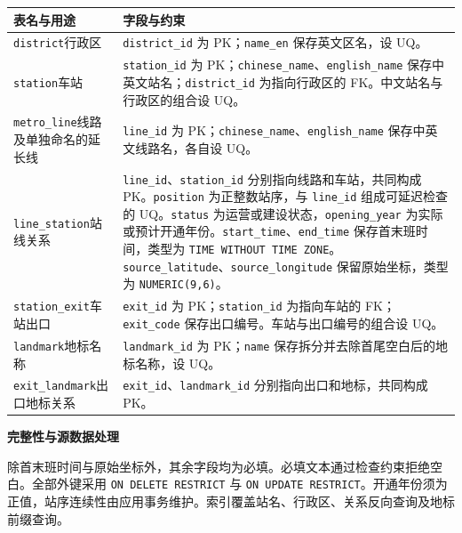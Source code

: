\documentclass[10pt,a4paper]{article}
\begin{document}
\begin{tabularx}{\linewidth}{@{}p{33mm}L@{}}
\toprule
\textbf{表名与用途} & \textbf{字段与约束}\\
\midrule
\texttt{district}\newline 行政区 &
\texttt{district\_id} 为 PK；\texttt{name\_en} 保存英文区名，设 UQ。\\
\addlinespace
\texttt{station}\newline 车站 &
\texttt{station\_id} 为 PK；\texttt{chinese\_name}、\texttt{english\_name} 保存中英文站名；\texttt{district\_id} 为指向行政区的 FK。中文站名与行政区的组合设 UQ。\\
\addlinespace
\texttt{metro\_line}\newline 线路及单独命名的延长线 &
\texttt{line\_id} 为 PK；\texttt{chinese\_name}、\texttt{english\_name} 保存中英文线路名，各自设 UQ。\\
\addlinespace
\texttt{line\_station}\newline 站线关系 &
\texttt{line\_id}、\texttt{station\_id} 分别指向线路和车站，共同构成 PK。\texttt{position} 为正整数站序，与 \texttt{line\_id} 组成可延迟检查的 UQ。\texttt{status} 为运营或建设状态，\texttt{opening\_year} 为实际或预计开通年份。\texttt{start\_time}、\texttt{end\_time} 保存首末班时间，类型为 \texttt{TIME WITHOUT TIME ZONE}。\texttt{source\_latitude}、\texttt{source\_longitude} 保留原始坐标，类型为 \texttt{NUMERIC(9,6)}。\\
\addlinespace
\texttt{station\_exit}\newline 车站出口 &
\texttt{exit\_id} 为 PK；\texttt{station\_id} 为指向车站的 FK；\texttt{exit\_code} 保存出口编号。车站与出口编号的组合设 UQ。\\
\addlinespace
\texttt{landmark}\newline 地标名称 &
\texttt{landmark\_id} 为 PK；\texttt{name} 保存拆分并去除首尾空白后的地标名称，设 UQ。\\
\addlinespace
\texttt{exit\_landmark}\newline 出口地标关系 &
\texttt{exit\_id}、\texttt{landmark\_id} 分别指向出口和地标，共同构成 PK。\\
\bottomrule
\end{tabularx}

\textbf{完整性与源数据处理}\par
除首末班时间与原始坐标外，其余字段均为必填。必填文本通过检查约束拒绝空白。全部外键采用 \texttt{ON DELETE RESTRICT} 与 \texttt{ON UPDATE RESTRICT}。开通年份须为正值，站序连续性由应用事务维护。索引覆盖站名、行政区、关系反向查询及地标前缀查询。
\end{document}
